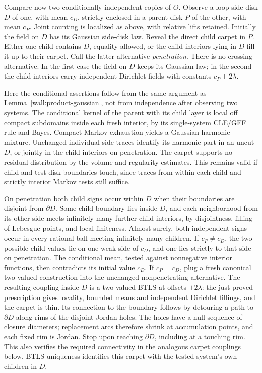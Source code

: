 Compare now two conditionally independent copies of $O$.  Observe a loop-side disk $D$ of one, with mean $c_D$, strictly enclosed in a parent disk $P$ of the other, with mean $c_P$.  Joint counting is localized as above, with relative lifts retained.  Initially the field on $D$ has its Gaussian side-disk law.  Reveal the direct child carpet in $P$.  Either one child contains $D$, equality allowed, or the child interiors lying in $D$ fill it up to their carpet.  Call the latter alternative \emph{penetration}.  There is no crossing alternative.  In the first case the field on $D$ keeps its Gaussian law; in the second the child interiors carry independent Dirichlet fields with constants $c_P\pm2\lambda$.

Here the conditional assertions follow from the same argument as Lemma~\ref{wall:product-gaussian}, not from independence after observing two systems.  The conditional kernel of the parent with its child layer is local off compact subdomains inside each fresh interior, by its single-system CLE/GFF rule and Bayes.  Compact Markov exhaustion yields a Gaussian-harmonic mixture.  Unchanged individual side traces identify its harmonic part in an uncut $D$, or jointly in the child interiors on penetration.  The carpet supports no residual distribution by the volume and regularity estimates.  This remains valid if child and test-disk boundaries touch, since traces from within each child and strictly interior Markov tests still suffice.

On penetration both child signs occur within $D$ when their boundaries are disjoint from $\partial D$.  Some child boundary lies inside $D$, and each neighborhood from its other side meets infinitely many further child interiors, by disjointness, filling of Lebesgue points, and local finiteness.  Almost surely, both independent signs occur in every rational ball meeting infinitely many children.  If $c_P\ne c_D$, the two possible child values lie on one weak side of $c_D$, and one lies strictly to that side on penetration.  The conditional mean, tested against nonnegative interior functions, then contradicts its initial value $c_D$.  If $c_P=c_D$, plug a fresh canonical two-valued construction into the unchanged nonpenetrating alternative.  The resulting coupling inside $D$ is a two-valued BTLS at offsets $\pm2\lambda$: the just-proved prescription gives locality, bounded means and independent Dirichlet fillings, and the carpet is thin.  Its connection to the boundary follows by detouring a path to $\partial D$ along rims of the disjoint Jordan holes.  The holes have a null sequence of closure diameters; replacement arcs therefore shrink at accumulation points, and each fixed rim is Jordan.  Stop upon reaching $\partial D$, including at a touching rim.  This also verifies the required connectivity in the analogous carpet couplings below.  BTLS uniqueness identifies this carpet with the tested system's own children in $D$.

